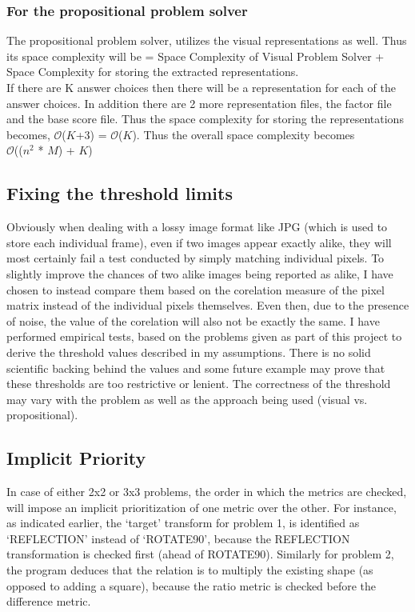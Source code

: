 \documentclass[10pt, letter]{article}
\newcommand{\bigO}{\ensuremath{\mathcal{O}}}
\begin{document}
\subsubsection*{For the propositional problem solver}
The propositional problem solver, utilizes the visual representations as well. Thus its space complexity will be = Space Complexity of Visual Problem Solver + Space Complexity for storing the extracted representations. \\
If there are K answer choices then there will be a representation for each of the answer choices. In addition there are 2 more representation files, the factor file and the base score file. Thus the space complexity for storing the representations becomes, \bigO{($K$+3)} = \bigO{($K$)}. Thus the overall space complexity becomes \\
\hspace*{3cm}\bigO{(($n^2$ * $M$) + $K$)}

\subsection*{Fixing the threshold limits}
Obviously when dealing with a lossy image format like JPG (which is used to store each individual frame), even if two images appear exactly alike, they will most certainly fail a test conducted by simply matching individual pixels. To slightly improve the chances of two alike images being reported as alike, I have chosen to instead compare them based on the corelation measure of the pixel matrix instead of the individual pixels themselves. Even then, due to the presence of noise, the value of the corelation will also not be exactly the same. I have performed empirical tests, based on the problems given as part of this project to derive the threshold values described in my assumptions. There is no solid scientific backing behind the values and some future example may prove that these thresholds are too restrictive or lenient. The correctness of the threshold may vary with the problem as well as the approach being used (visual vs. propositional).

\subsection*{Implicit Priority}
In case of either 2x2 or 3x3 problems, the order in which the metrics are checked, will impose an implicit prioritization of one metric over the other. For instance, as indicated earlier, the `target' transform for problem 1, is identified as `REFLECTION' instead of `ROTATE90', because the REFLECTION transformation is checked first (ahead of ROTATE90). Similarly for problem 2, the program deduces that the relation is to multiply the existing shape (as opposed to adding a square), because the ratio metric is checked before the difference metric. 
\end{document}
